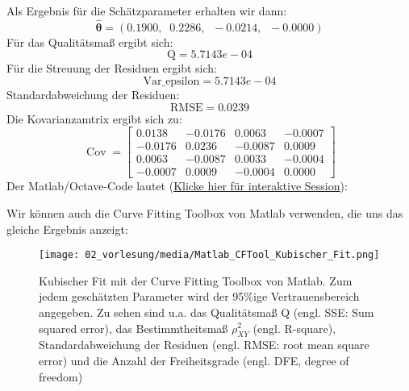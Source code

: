 Als Ergebnis für die Schätzparameter erhalten wir dann: 
\[\hat{\boldsymbol\theta} = 
(0.1900, \;\; 0.2286,\;\; -0.0214, \;\; -0.0000) \]
Für das Qualitätsmaß ergibt sich: 
\[\mathrm{Q} = 5.7143e-04 \]
Für die Streuung der Residuen ergibt sich: 
\[\mathrm{Var\_epsilon} = 5.7143e-04 \]
Standardabweichung der Residuen: 
\[
\mathrm{RMSE} = 0.0239 \]
Die Kovarianzamtrix ergibt sich zu: 
\[
\operatorname{Cov} =
\begin{bmatrix}
0.0138  & -0.0176  &  0.0063  & -0.0007 \\
-0.0176 &   0.0236 &  -0.0087 &  0.0009 \\
0.0063  &  -0.0087 &   0.0033 &  -0.0004 \\
-0.0007 &   0.0009 &  -0.0004  &  0.0000
\end{bmatrix}
\]
Der Matlab/Octave-Code lautet (\href{https://mybinder.org/v2/gh/dhueser/MDA-Vorlesung-iprom-tu-bs/master?urlpath=/lab/tree/vorlesung/02_vorlesung/code/cubic_fit.ipynb}{Klicke hier für interaktive Session}): 


Wir können auch die Curve Fitting Toolbox von Matlab 
verwenden, die uns das gleiche Ergebnis anzeigt:
\begin{figure}[!htp]
	\begin{center}
		\texttt{[image: 02\_vorlesung/media/Matlab\_CFTool\_Kubischer\_Fit.png]}
		\caption{Kubischer Fit mit der Curve Fitting Toolbox von Matlab. 
			Zum jedem geschätzten Parameter wird der 95\%ige Vertrauensbereich 
			angegeben. Zu sehen sind u.a. das Qualitätsmaß Q (engl. SSE: Sum squared error), das Bestimmtheitsmaß $\rho^2_{XY}$ (engl. R-square), Standardabweichung der Residuen (engl. RMSE: root mean square error) und die Anzahl der Freiheitsgrade (engl. DFE, degree of freedom)}
		\label{fig:CFTool_kubischerFit}
	\end{center}
\end{figure}
\newpage


